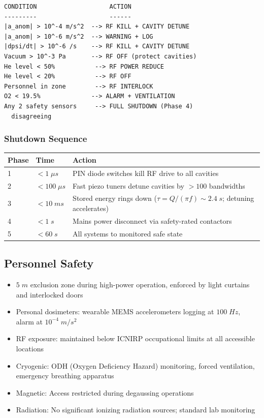 \documentclass[11pt,a4paper]{article}
\begin{document}
\begin{tcolorbox}[colback=red!3, colframe=red!60!black,
title=Safety Interlock Trip Matrix]
\begin{verbatim}
CONDITION                    ACTION
---------                    ------
|a_anom| > 10^-4 m/s^2  --> RF KILL + CAVITY DETUNE
|a_anom| > 10^-6 m/s^2  --> WARNING + LOG
|dpsi/dt| > 10^-6 /s    --> RF KILL + CAVITY DETUNE
Vacuum > 10^-3 Pa       --> RF OFF (protect cavities)
He level < 50%           --> RF POWER REDUCE
He level < 20%           --> RF OFF
Personnel in zone        --> RF INTERLOCK
O2 < 19.5%              --> ALARM + VENTILATION
Any 2 safety sensors     --> FULL SHUTDOWN (Phase 4)
  disagreeing
\end{verbatim}
\end{tcolorbox}

\subsubsection{Shutdown Sequence}

\begin{longtable}{p{}p{}p{}}
\toprule
\textbf{Phase} & \textbf{Time} & \textbf{Action} \\
\midrule
\endhead
1 & $< 1\;\si{\mu s}$ & PIN diode switches kill RF drive to all cavities \\
2 & $< 100\;\si{\mu s}$ & Fast piezo tuners detune cavities by $> 100$
bandwidths \\
3 & $< 10\;\si{ms}$ & Stored energy rings down ($\tau = Q/(\pi f)
\sim 2.4\;\si{s}$; detuning accelerates) \\
4 & $< 1\;\si{s}$ & Mains power disconnect via safety-rated
contactors \\
5 & $< 60\;\si{s}$ & All systems to monitored safe state \\
\bottomrule
\end{longtable}

\subsection{Personnel Safety}

\begin{itemize}[nosep]
\item $5\;\si{m}$ exclusion zone during high-power operation,
enforced by light curtains and interlocked doors
\item Personal dosimeters: wearable MEMS accelerometers logging
at $100\;\si{Hz}$, alarm at $10^{-4}\;\si{m/s^2}$
\item RF exposure: maintained below ICNIRP occupational limits
at all accessible locations
\item Cryogenic: ODH (Oxygen Deficiency Hazard) monitoring,
forced ventilation, emergency breathing apparatus
\item Magnetic: Access restricted during degaussing operations
\item Radiation: No significant ionizing radiation sources;
standard lab monitoring
\end{itemize}
\end{document}
